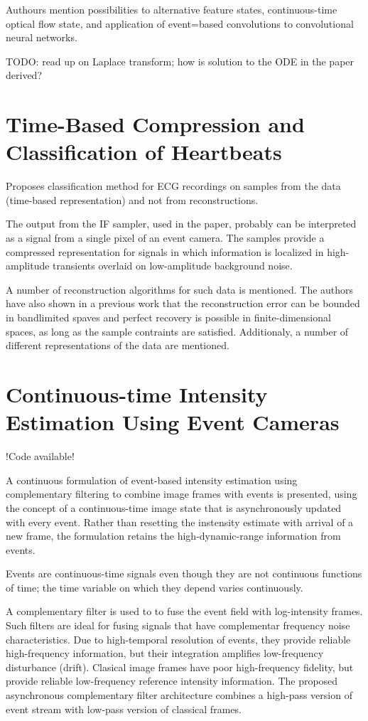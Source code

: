 \documentclass[10pt,a4paper]{article}
\begin{document}
Authours mention possibilities to alternative feature states, continuous-time optical flow state, and application of event=based convolutions to convolutional neural networks.

TODO: read up on Laplace transform; how is solution to the ODE in the paper derived?

\section{Time-Based Compression and Classification of Heartbeats}
Proposes classification method for ECG recordings on samples from the data (time-based representation) and not from reconstructions.

The output from the IF sampler, used in the paper, probably can be interpreted as a signal from a single pixel of an event camera.
The samples provide a compressed representation for signals in which information is localized in high-amplitude transients overlaid on low-amplitude background noise.

A number of reconstruction algorithms for such data is mentioned.
The authors have also shown in a previous work that the reconstruction error can be bounded in bandlimited spaves and perfect recovery is possible in finite-dimensional spaces, as long as the sample contraints are satisfied.
Additionaly, a number of different representations of the data are mentioned.

\section{Continuous-time Intensity Estimation Using Event Cameras}
!Code available!

A continuous formulation of event-based intensity estimation using complementary filtering to combine image frames with events is presented, using the concept of a continuous-time image state that is asynchronously updated with every event.
Rather than resetting the instensity estimate with arrival of a new frame, the formulation retains the high-dynamic-range information from events.

Events are continuous-time signals even though they are not continuous functions of time; the time variable on which they depend varies continuously.

A complementary filter is used to to fuse the event field with log-intensity frames. 
Such filters are ideal for fusing signals that have complementar frequency noise characteristics.
Due to high-temporal resolution of events, they provide reliable high-frequency information, but their integration amplifies low-frequency disturbance (drift).
Clasical image frames have poor high-frequency fidelity, but provide reliable low-frequency reference intensity information.
The proposed asynchronous complementary filter architecture combines a high-pass version of event stream with low-pass version of classical frames.
\end{document}
